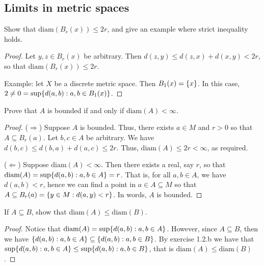\subsection{Limits in metric spaces}


\begin{exercise}{27}
Show that $\text{diam}(B_r(x))\leq 2r$, and give an example where strict inequality holds.
\end{exercise}
\begin{proof}
Let $y,z\in B_r(x)$ be arbitrary. Then $d(z,y)\leq d(z,x)+d(x,y)<2r$, so that $\text{diam}(B_r(x))\leq 2r$. 

Example: let $X$ be a discrete metric space. Then $B_1(x)=\{x\}$. In this case, $2\neq 0=\sup\{d(a,b):a,b\in B_1(x)\}$.
\end{proof} 

\begin{exercise}{29}
Prove that $A$ is bounded if and only if $\text{diam}(A)<\infty$.
\end{exercise}
\begin{proof}
($\Rightarrow$) Suppose $A$ is bounded. Thus, there exists $a\in M$ and $r>0$ so that $A\subseteq B_r(a)$. Let $b,c\in A$ be arbitrary. We have $d(b,c)\leq d(b,a)+d(a,c)\leq 2r$. Thus, $\text{diam}(A)\leq 2r<\infty$, as required.

($\Leftarrow$) Suppose $\text{diam}(A)<\infty$. Then there exists a real, say $r$, so that $\text{diam}(A) =\sup\{d(a,b):a,b\in A\} =r$. That is, for all $a,b\in A$, we have $d(a,b)<r$, hence we can find a point in $a\in A\subseteq M$ so that $A\subseteq B_r(a)=\{y\in M:d(a,y)<r\}$. In words, $A$ is bounded.
\end{proof} 

\begin{exercise}{30}
If $A\subseteq B$, show that $\text{diam}(A)\leq\text{diam}(B)$.
\end{exercise}
\begin{proof}
Notice that $\text{diam}(A) =\sup\{d(a,b):a,b\in A\}$. However, since $A\subseteq B$, then we have $\{d(a,b):a,b\in A\} \subseteq\{d(a,b):a,b\in B\}$. By exercise 1.2.b we have that $\sup\{d(a,b):a,b\in A\} \leq\sup\{d(a,b):a,b\in B\}$, that is $\text{diam}(A) \leq\text{diam}(B)$.
\end{proof} 

